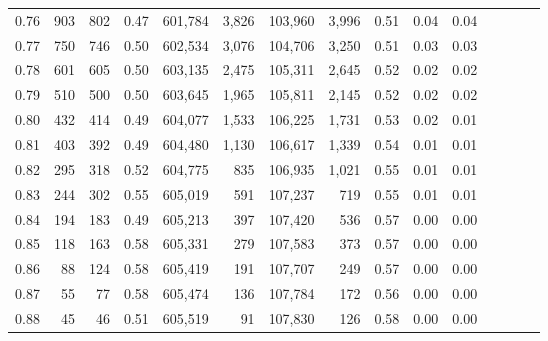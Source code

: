 \begin{tabular}{rrrcrrrrrrrrrrr}
0.76 &     903 &    802 &                                       0.47 &  601,784 &    3,826 &  103,960 &    3,996 &  0.51 &  0.04 &                         0.04 \\
0.77 &     750 &    746 &                                       0.50 &  602,534 &    3,076 &  104,706 &    3,250 &  0.51 &  0.03 &                         0.03 \\
0.78 &     601 &    605 &                                       0.50 &  603,135 &    2,475 &  105,311 &    2,645 &  0.52 &  0.02 &                         0.02 \\
0.79 &     510 &    500 &                                       0.50 &  603,645 &    1,965 &  105,811 &    2,145 &  0.52 &  0.02 &                         0.02 \\
0.80 &     432 &    414 &                                       0.49 &  604,077 &    1,533 &  106,225 &    1,731 &  0.53 &  0.02 &                         0.01 \\
0.81 &     403 &    392 &                                       0.49 &  604,480 &    1,130 &  106,617 &    1,339 &  0.54 &  0.01 &                         0.01 \\
0.82 &     295 &    318 &                                       0.52 &  604,775 &      835 &  106,935 &    1,021 &  0.55 &  0.01 &                         0.01 \\
0.83 &     244 &    302 &                                       0.55 &  605,019 &      591 &  107,237 &      719 &  0.55 &  0.01 &                         0.01 \\
0.84 &     194 &    183 &                                       0.49 &  605,213 &      397 &  107,420 &      536 &  0.57 &  0.00 &                         0.00 \\
0.85 &     118 &    163 &                                       0.58 &  605,331 &      279 &  107,583 &      373 &  0.57 &  0.00 &                         0.00 \\
0.86 &      88 &    124 &                                       0.58 &  605,419 &      191 &  107,707 &      249 &  0.57 &  0.00 &                         0.00 \\
0.87 &      55 &     77 &                                       0.58 &  605,474 &      136 &  107,784 &      172 &  0.56 &  0.00 &                         0.00 \\
0.88 &      45 &     46 &                                       0.51 &  605,519 &       91 &  107,830 &      126 &  0.58 &  0.00 &                         0.00 \\

\end{tabular}
